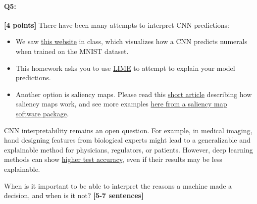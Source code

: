 \paragraph{Q5:} \textbf{[4 points]} There have been many attempts to interpret CNN predictions:
\begin{itemize}
    \item We saw \href{https://www.cs.cmu.edu/~aharley/vis/conv/}{this website} in class, which visualizes how a CNN predicts numerals when trained on the MNIST dataset.
    
    \item This homework asks you to use \href{https://www.oreilly.com/content/introduction-to-local-interpretable-model-agnostic-explanations-lime/}{LIME} to attempt to explain your model predictions. 

    \item Another option is saliency maps. Please read this \href{https://opendatascience.com/visualizing-your-convolutional-neural-network-predictions-with-saliency-maps/}{short article} describing how saliency maps work, and see more examples \href{https://github.com/jacobgil/pytorch-grad-cam}{here from a saliency map software package}.
\end{itemize}
CNN interpretability remains an open question. For example, in medical imaging, hand designing features from biological experts might lead to a generalizable and explainable method for physicians, regulators, or patients. However, deep learning methods can show \href{https://drive.google.com/file/d/1bDAqEtW482OJeqMBt5A4AradVa4gf_o9/view}{higher test accuracy}, even if their results may be less explainable.

\begin{tcolorbox}[colback=orange!5!white,colframe=orange!75!black]
When is it important to be able to interpret the reasons a machine made a decision, and when is it not? \textbf{[5-7 sentences]}
\end{tcolorbox}



